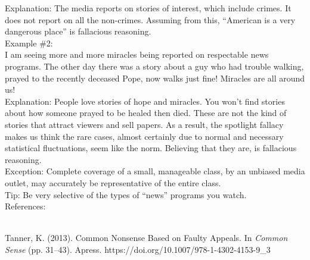 \documentclass[a4paper,12pt,single,pdftex]{scrbook}
\begin{document}
    
      Explanation: The media reports on stories of interest, which include crimes.  It does not report on all the non-crimes.  Assuming from this, “American is a very dangerous place” is fallacious reasoning.
    \\

    
      Example \#2:
    \\

    
      I am seeing more and more miracles being reported on respectable news programs.  The other day there was a story about a guy who had trouble walking, prayed to the recently deceased Pope, now walks just fine!  Miracles are all around us!
    \\

    
      Explanation: People love stories of hope and miracles.  You won’t find stories about how someone prayed to be healed then died.  These are not the kind of stories that attract viewers and sell papers.  As a result, the spotlight fallacy makes us think the rare cases, almost certainly due to normal and necessary statistical fluctuations, seem like the norm.  Believing that they are, is fallacious reasoning.
    \\

    
      Exception: Complete coverage of a small, manageable class, by an unbiased media outlet, may accurately be representative of the entire class.
    \\

    
      Tip: Be very selective of the types of “news” programs you watch.
    \\

    References:

    
      
        
      \\

      
        
          Tanner, K. (2013). Common Nonsense Based on Faulty Appeals. In {\it Common Sense} (pp. 31–43). Apress. https://doi.org/10.1007/978-1-4302-4153-9\_3
        
      
    
\end{document}
